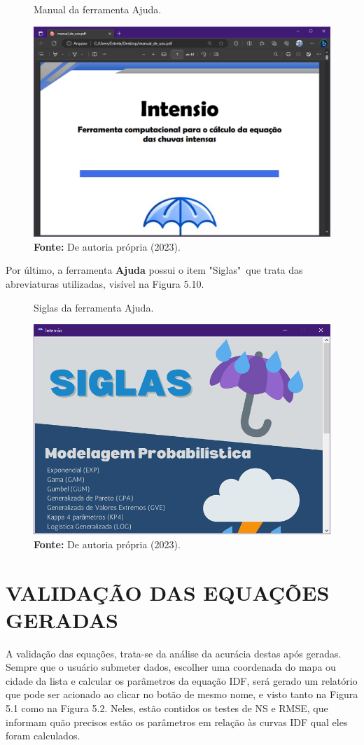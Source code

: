 \begin{figure}[!ht]
	\centering
	\caption{Manual da ferramenta Ajuda.}
	\includegraphics[width=.7625\linewidth]{figuras/manual.png}
	\caption*{\textbf{Fonte:} De autoria própria (2023).}
	\label{fig:figuras/manual.png}
\end{figure}

Por último, a ferramenta \textbf{Ajuda} possui o item "Siglas"\ que trata das abreviaturas utilizadas, visível na Figura 5.10.

\begin{figure}[!ht]
	\centering
	\caption{Siglas da ferramenta Ajuda.}
	\includegraphics[width=.7625\linewidth]{figuras/siglas.png}
	\caption*{\textbf{Fonte:} De autoria própria (2023).}
	\label{fig:figuras/siglas.png}
\end{figure}

\newpage

\section{VALIDAÇÃO DAS EQUAÇÕES GERADAS}

A validação das equações, trata-se da análise da acurácia destas após geradas. Sempre que o usuário submeter dados, escolher uma coordenada do mapa ou cidade da lista e calcular os parâmetros da equação IDF, será gerado um relatório que pode ser acionado ao clicar no botão de mesmo nome, e visto tanto na Figura 5.1 como na Figura 5.2. Neles, estão contidos os testes de NS e RMSE, que informam quão precisos estão os parâmetros em relação às curvas IDF qual eles foram calculados.

